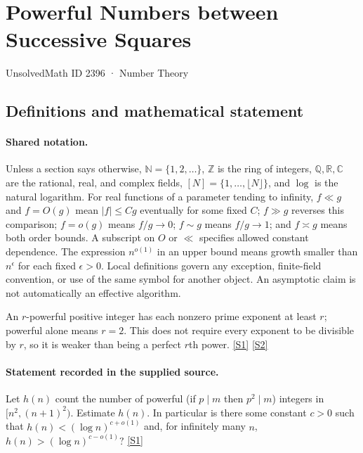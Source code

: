 \documentclass[11pt,a4paper]{article}
\newcommand{\N}{\mathbb{N}}
\newcommand{\Z}{\mathbb{Z}}
\newcommand{\Q}{\mathbb{Q}}
\newcommand{\R}{\mathbb{R}}
\newcommand{\C}{\mathbb{C}}
\newcommand{\sref}[2]{\hyperlink{source:#1:#2}{[S#2]}}
\begin{document}

\setcounter{section}{2395}

\section{Powerful Numbers between Successive Squares}\label{2396}

{\small\sffamily UnsolvedMath ID 2396 · Number Theory}

\subsection{Definitions and mathematical statement}

\paragraph{Shared notation.}Unless a section says otherwise, $\N=\{1,2,\ldots\}$,
$\Z$ is the ring of integers, $\Q,\R,\C$ are the rational, real, and complex
fields, $[N]=\{1,\ldots,\lfloor N\rfloor\}$, and $\log$ is the natural
logarithm. For real functions of a parameter tending to infinity,
$f\ll g$ and $f=O(g)$ mean $|f|\leq Cg$ eventually for some fixed $C$;
$f\gg g$ reverses this comparison; $f=o(g)$ means $f/g\to0$;
$f\sim g$ means $f/g\to1$; and $f\asymp g$ means both order bounds.
A subscript on $O$ or $\ll$ specifies allowed constant dependence.
The expression $n^{o(1)}$ in an upper bound means growth smaller than
$n^\epsilon$ for each fixed $\epsilon>0$. Local definitions govern any
exception, finite-field convention, or use of the same symbol for another
object. An asymptotic claim is not automatically an effective algorithm.



An $r$-powerful positive integer has each nonzero prime exponent at least $r$; powerful alone means $r=2$. This does not require every exponent to be divisible by $r$, so it is weaker than being a perfect $r$th power. \sref{2396}{1} \sref{2396}{2}

\paragraph{Statement recorded in the supplied source.}
Let $h(n)$ count the number of powerful (if $p\mid m$ then $p^2\mid m$) integers in $[n^2,(n+1)^2)$. Estimate $h(n)$. In particular is there some constant $c>0$ such that $ h(n) < (\log n)^{c+o(1)} $ and, for infinitely many $n$, $ h(n) >(\log n)^{c-o(1)}? $ \sref{2396}{1}
\end{document}
